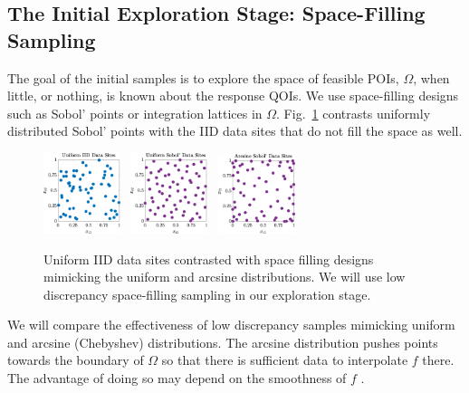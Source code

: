 \documentclass[11pt]{NSFamsart}
\begin{document}
\subsection{The Initial Exploration Stage: Space-Filling Sampling} \label{sec:Explore}

The goal of the initial samples is to explore the space of feasible POIs, $\Omega$, when little, or nothing, is known about the response QOIs. We use space-filling designs such as Sobol' points \cite{DicPil10a} or integration lattices \cite{SloJoe94, DicEtal14a} in $\Omega$.  Fig.\ \ref{PtsFig} contrasts uniformly distributed Sobol' points with the IID data sites that do not fill the space as well.


\begin{figure} %
\centering
\includegraphics[width = 0.20\textwidth]{ProgramsImages/IIDPoints.eps} \ 
\includegraphics[width = 0.20\textwidth]{ProgramsImages/SSobolPoints.eps} \ 
\includegraphics[width = 0.20\textwidth]{ProgramsImages/ChebSSobolPoints.eps} 
\caption{Uniform IID data sites contrasted with space filling designs mimicking the uniform  and arcsine distributions.
We will use low discrepancy space-filling sampling in our exploration stage.
\label{PtsFig}}
\end{figure}

We will compare the effectiveness of low discrepancy samples mimicking uniform and arcsine (Chebyshev) distributions.
The arcsine distribution pushes points towards the boundary of $\Omega$ so that there is sufficient data to interpolate $f$ there.  The advantage of doing so may depend on the smoothness of $f$ \cite{HicLi12a}.
\end{document}
